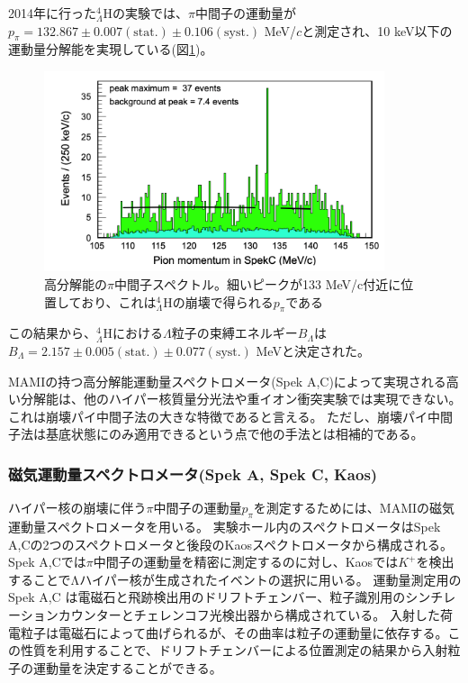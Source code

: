 \documentclass[a4paper,11pt,uplatex]{jsbook}
\begin{document}
2014年に行った$^4_{\Lambda}\text{H}$の実験\cite{Schulz2015}では、$\pi$中間子の運動量が
$p_\pi = 132.867 \pm 0.007(\text{stat.}) \pm 0.106(\text{syst.})$ MeV/$c$と測定され、10 keV以下の運動量分解能を実現している(図\ref{fig:pi_spec})。
\begin{figure}[H]
  \centering
  \includegraphics[width=10cm]{image/1-PionSpectrum.png}
  \caption[過去実験での$p_\pi$スペクトル]{高分解能の$\pi$中間子スペクトル。細いピークが133 MeV/c付近に位置しており、これは$^4_{\Lambda}\text{H}$の崩壊で得られる$p_\pi$である\cite{Schulz2015}}
  \label{fig:pi_spec}
\end{figure}

この結果から、$^4_{\Lambda}\text{H}$における$\Lambda$粒子の束縛エネルギー$B_\Lambda$は$B_\Lambda = 2.157 \pm 0.005(\text{stat.}) \pm 0.077(\text{syst.})$ MeVと決定された。

MAMIの持つ高分解能運動量スペクトロメータ(Spek A,C)によって実現される高い分解能は、他のハイパー核質量分光法や重イオン衝突実験では実現できない。
これは崩壊パイ中間子法の大きな特徴であると言える。
ただし、崩壊パイ中間子法は基底状態にのみ適用できるという点で他の手法とは相補的である。

\subsubsection{磁気運動量スペクトロメータ(Spek A, Spek C, Kaos)}
ハイパー核の崩壊に伴う$\pi$中間子の運動量$p_\pi$を測定するためには、MAMIの磁気運動量スペクトロメータを用いる。
実験ホール内のスペクトロメータはSpek A,Cの2つのスペクトロメータと後段のKaosスペクトロメータから構成される。Spek A,Cでは$\pi$中間子の運動量を精密に測定するのに対し、Kaosでは$K^+$を検出することでΛハイパー核が生成されたイベントの選択に用いる。
運動量測定用のSpek A,C は電磁石と飛跡検出用のドリフトチェンバー、粒子識別用のシンチレーションカウンターとチェレンコフ光検出器から構成されている。
入射した荷電粒子は電磁石によって曲げられるが、その曲率は粒子の運動量に依存する。この性質を利用することで、ドリフトチェンバーによる位置測定の結果から入射粒子の運動量を決定することができる。
\end{document}
